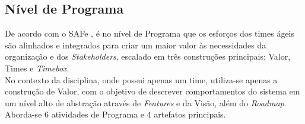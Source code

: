 		\subsection[Nível de Programa]{Nível de Programa}
		\label{subsec:processo_atividade_programa}
			De acordo com o SAFe \cite{safe}, é no nível de Programa que os esforços dos times ágeis são alinhados e integrados para criar um maior valor às necessidades da organização e dos \emph{Stakeholders}, escalado em três construções principais: Valor, Times e \emph{Timebox}.
			\\ \indent No contexto da disciplina, onde possui apenas um time, utiliza-se apenas a construção de Valor, com o objetivo de descrever comportamentos do sistema em um nível alto de abstração através de \emph{Features} e da Visão, além do \emph{Roadmap}. Aborda-se 6 atividades de Programa e 4 artefatos principais.

